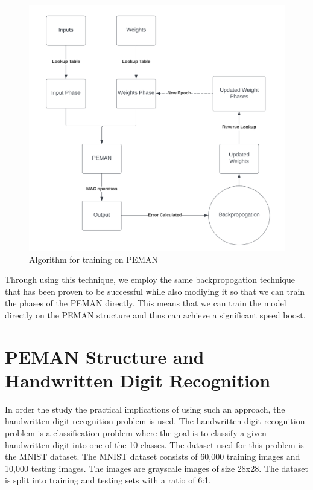 \begin{figure}
	\centering
	\includegraphics[width=\textwidth]{images/trainOnPemanAlgo.png}
	\caption{Algorithm for training on PEMAN}
	\label{trainOnPemanAlgo}
\end{figure}

Through using this technique, we employ the same backpropogation technique that has been proven to be successful while also modiying it so that we can train the phases of the PEMAN directly. This means that we can train the model directly on the PEMAN structure and thus can achieve a significant speed boost.

\section{PEMAN Structure and Handwritten Digit Recognition}

In order the study the practical implications of using such an approach, the handwritten digit recognition problem is used. The handwritten digit recognition problem is a classification problem where the goal is to classify a given handwritten digit into one of the 10 classes. The dataset used for this problem is the MNIST dataset. The MNIST dataset consists of 60,000 training images and 10,000 testing images. The images are grayscale images of size 28x28. The dataset is split into training and testing sets with a ratio of 6:1.

